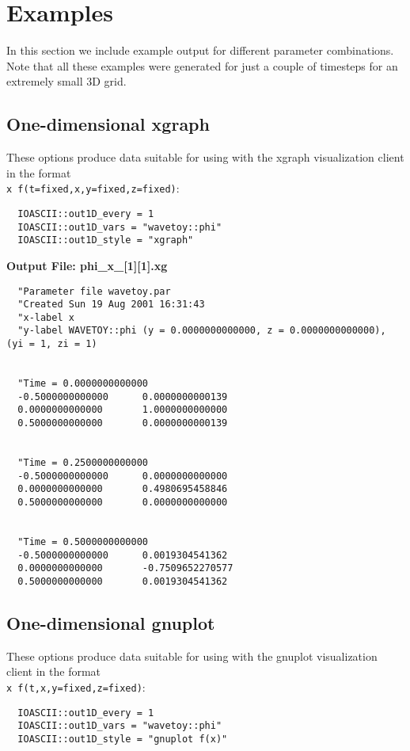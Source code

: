 \documentclass{article}
\begin{document}
\section{Examples}

In this section we include example output for different parameter combinations.
Note that all these examples were generated for just a couple of timesteps for an extremely small 3D grid.

\subsection{One-dimensional xgraph}

These options produce data suitable for using with the xgraph
visualization client in the format\\
\texttt{x~f(t=fixed,x,y=fixed,z=fixed)}:

\begin{verbatim}
  IOASCII::out1D_every = 1
  IOASCII::out1D_vars = "wavetoy::phi"
  IOASCII::out1D_style = "xgraph"
\end{verbatim}

\noindent
{\bf Output File: phi\_x\_[1][1].xg}

\begin{verbatim}
  "Parameter file wavetoy.par
  "Created Sun 19 Aug 2001 16:31:43
  "x-label x
  "y-label WAVETOY::phi (y = 0.0000000000000, z = 0.0000000000000), (yi = 1, zi = 1)


  "Time = 0.0000000000000
  -0.5000000000000		0.0000000000139
  0.0000000000000		1.0000000000000
  0.5000000000000		0.0000000000139


  "Time = 0.2500000000000
  -0.5000000000000		0.0000000000000
  0.0000000000000		0.4980695458846
  0.5000000000000		0.0000000000000


  "Time = 0.5000000000000
  -0.5000000000000		0.0019304541362
  0.0000000000000		-0.7509652270577
  0.5000000000000		0.0019304541362
\end{verbatim}


\subsection{One-dimensional gnuplot}

These options produce data suitable for using with the gnuplot visualization client in the format\\ {\tt x f(t,x,y=fixed,z=fixed)}:

\begin{verbatim}
  IOASCII::out1D_every = 1
  IOASCII::out1D_vars = "wavetoy::phi"
  IOASCII::out1D_style = "gnuplot f(x)"
\end{verbatim}
\end{document}
